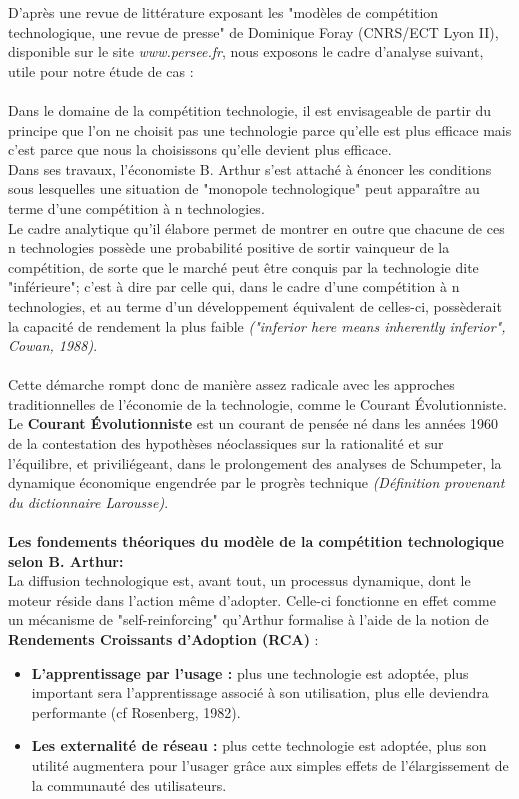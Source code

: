 \documentclass[a4paper, 10pt]{article}
\begin{document}
D'après une revue de littérature exposant les "modèles de compétition technologique, une revue de presse" de Dominique Foray (CNRS/ECT Lyon II),
disponible sur le site \textit{www.persee.fr}, nous exposons le cadre d'analyse suivant, utile pour notre étude de cas :\\ \\
Dans le domaine de la compétition technologie, il est envisageable de partir du principe que l'on ne choisit pas une technologie parce
qu'elle est plus efficace mais c'est parce que nous la choisissons qu'elle devient plus efficace.\\
Dans ses travaux, l'économiste B. Arthur s'est attaché à énoncer les conditions sous lesquelles une situation de "monopole technologique"
peut apparaître au terme d'une compétition à n technologies.\\
Le cadre analytique qu'il élabore permet de montrer en outre que chacune de ces n technologies possède
une probabilité positive de sortir vainqueur de la compétition, de sorte que le marché peut être conquis par la technologie dite "inférieure";
c'est à dire par celle qui, dans le cadre d'une compétition à n technologies, et au terme d'un développement équivalent de celles-ci,
possèderait la capacité de rendement la plus faible \textit{("inferior here means inherently inferior", Cowan, 1988)}.\\ \\
Cette démarche rompt donc de manière assez radicale avec les approches traditionnelles de l'économie de la technologie,
comme le Courant Évolutionniste.\\
Le \textbf{Courant Évolutionniste} est un courant de pensée né dans les années 1960 de la contestation des hypothèses néoclassiques
sur la rationalité et sur l'équilibre, et priviliégeant, dans le prolongement des analyses de Schumpeter,
la dynamique économique engendrée par le progrès technique \textit{(Définition provenant du dictionnaire Larousse)}.\\ \\
\textbf{Les fondements théoriques du modèle de la compétition technologique selon B. Arthur:}\\
La diffusion technologique est, avant tout, un processus dynamique, dont le moteur réside dans l'action même d'adopter.
Celle-ci fonctionne en effet comme un mécanisme de "self-reinforcing" qu'Arthur formalise à l'aide de la notion
de \textbf{Rendements Croissants d'Adoption (RCA)} :
\begin{itemize}
 \item \textbf{L'apprentissage par l'usage :} plus une technologie est adoptée, plus important sera l'apprentissage associé à son utilisation,
plus elle deviendra performante (cf Rosenberg, 1982).
 \item \textbf{Les externalité de réseau :} plus cette technologie est adoptée,
plus son utilité augmentera pour l'usager grâce aux simples effets de l'élargissement de la communauté des utilisateurs.
\end{itemize}
\end{document}

